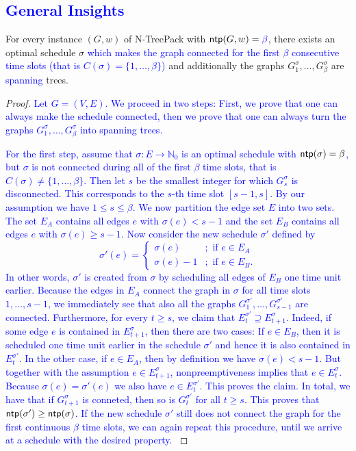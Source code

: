 \documentclass[runningheads]{llncs}
\newcommand{\NN}{\mathbb{N}}
\newcommand{\set}[1]{\{ #1 \}}
\newcommand{\fromto}[2]{\set{#1, \ldots, #2}}
\newcommand{\xxxNTP}{{\sc N-TreePack}}
\DeclareMathOperator{\ntp}{\text{\sf ntp}}
\newcommand{\lasse}[1]{\textcolor{blue}{#1}}
\begin{document}
\subsection{\lasse{General Insights}}

\begin{lemma}
\label{le:structure}
For every instance $(G,w)$ of {\xxxNTP} with $\ntp(G,w)=\lasse{\beta}$, there exists an optimal schedule $\sigma$ 
\lasse{which makes the graph connected for the first $\beta$ consecutive time slots (that is $C(\sigma) = \fromto{1}{\beta}$)} and additionally the graphs $G^\sigma_1,\ldots,G^\sigma_\beta$ are \lasse{spanning} trees.
\end{lemma}

\begin{proof}
\lasse{
Let $G = (V,E)$. We proceed in two steps: First, we prove that one can always make the schedule connected, then we prove that one can always turn the graphs $G^\sigma_1,\ldots,G^\sigma_\beta$ into spanning trees.
}

\lasse{
For the first step, assume that $\sigma : E \rightarrow \NN_0$ is an optimal schedule with $\ntp(\sigma) = \beta$, but $\sigma$ is not connected during all of the first $\beta$ time slots, that is $C(\sigma) \neq \fromto{1}{\beta}$.
 Then let $s$ be the smallest integer for which $G^\sigma_s$ is disconnected.
  This corresponds to the $s$-th time slot $[s-1,s]$. By our assumption we have $1 \leq s \leq \beta$. We now partition the edge set $E$ into two sets. The set $E_A$ contains all edges $e$ with $\sigma(e) < s-1$ and the set $E_B$ contains all edges $e$ with $\sigma(e) \geq s-1$. Now consider the new schedule $\sigma'$ defined by
\[
\sigma'(e) = \begin{cases} \sigma(e) &;\text{ if } e \in E_A\\
\sigma(e) - 1&;\text{ if } e \in E_B.
\end{cases}
\]
In other words, $\sigma'$ is created from $\sigma$ by scheduling all edges of $E_B$ one time unit earlier. 
Because the edges in $E_A$ connect the graph in $\sigma$ for all time slots $1,\ldots,s-1$, we immediately see that also all the graphs $G_1^{\sigma'},\ldots,G^{\sigma'}_{s-1}$ are connected. 
Furthermore, for every $t \geq s$, we claim that $E^{\sigma'}_t \supseteq E^\sigma_{t+1}$. 
Indeed, if some edge $e$ is contained in $E^\sigma_{t+1}$, then there are two cases: 
If $e \in E_B$, then it is scheduled one time unit earlier in the schedule $\sigma'$ and hence it is also contained in $E^{\sigma'}_t$. 
In the other case, if $e \in E_A$, then by definition we have $\sigma(e) < s-1$. 
But together with the assumption $e \in E^\sigma_{t+1}$, nonpreemptiveness implies that $e \in E^\sigma_t$. 
Because $\sigma(e) = \sigma'(e)$ we also have $e \in E^{\sigma'}_t$. This proves the claim. In total, we have that if $G^\sigma_{t+1}$ is conneted, then so is $G^{\sigma'}_{t}$ for all $t \geq s$. This proves that $\ntp(\sigma') \geq \ntp(\sigma)$.
 If the new schedule $\sigma'$ still does not connect the graph for the first continuous $\beta$ time slots, we can again repeat this procedure, until we arrive at a schedule with the desired property.
}


\end{proof}
\end{document}
